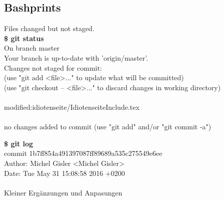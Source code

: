 \subsection{Bashprints}
\begin{multicols}{2}
\begin{minipage}[l]{.40\textwidth}
    Files changed but not staged.\\    
    \textbf{\$ git status}\\
    On branch master\\
    Your branch is up-to-date with 'origin/master'.\\
    Changes not staged for commit:\\
    \quad (use "git add <file>..." to update what will be committed)\\
    \quad (use "git checkout -- <file>..." to discard changes in working directory)\\
    \\
    \qquad modified:\quad idiotenseite/IdiotenseiteInclude.tex\\
    \\
    no changes added to commit (use "git add" and/or "git commit -a")\\
\end{minipage}

\begin{minipage}[r]{.40\textwidth}
    \textbf{\$ git log}\\
    commit 1b7ff854a491397087ff89689a535c275549e6ee\\
    Author: \quad Michel Gisler <Michel Gisler>\\
    Date:  \quad  Tue May 31 15:08:58 2016 +0200\\
    \\  
    \qquad Kleiner Ergänzungen und Anpasungen\\
\end{minipage}
\end{multicols}

\clearpage